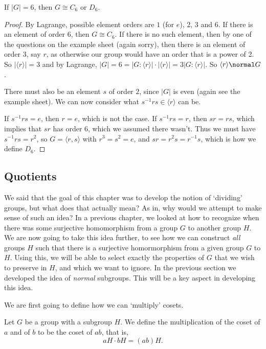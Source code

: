 \documentclass[a4paper]{scrartcl}
\newcommand{\newsection}{\subsection}
\begin{document}
\begin{proposition}
	If $|G| = 6$, then $G \cong C_6$ or $D_6$.
\end{proposition}
\begin{proof}
	By Lagrange, possible element orders are $1$ (for $e$), $2$, $3$ and $6$. If there is an element of order 6, then $G \cong C_6$. If there is no such element, then by one of the questions on the example sheet (again sorry), then there is an element of order $3$, say $r$, as otherwise our group would have an order that is a power of 2. So $|\langle r \rangle| = 3$ and by Lagrange, $|G| = 6 = |G: \langle r \rangle| \cdot |\langle r \rangle| = 3 |G: \langle r \rangle|$. So $\langle r \rangle \normal G$.

	There must also be an element $s$ of order $2$, since $|G|$ is even (again see the example sheet). We can now consider what $s^{-1} r s \in \langle r \rangle$ can be.

	If $s^{-1} r s = e$, then $r = e$, which is not the case. If $s^{-1} r s = r$, then $sr = rs$, which implies that $sr$ has order 6, which we assumed there wasn't. Thus we must have $s^{-1} r s = r^2$, so $G = \langle r, s \rangle$ with $r^3 = s^2 = e$, and $sr = r^2 s = r^{-1}s$, which is how we define $D_6$.
\end{proof}

\newsection{Quotients}

We said that the goal of this chapter was to develop the notion of `dividing' groups, but what does that actually mean? As in, why would we attempt to make sense of such an idea?
In a previous chapter, we looked at how to recognize when there was some surjective homomorphism from a group $G$ to another group $H$.
We are now going to take this idea further, to see how we can construct \emph{all} groups $H$ such that there is a surjective homormorphism from a given group $G$ to $H$.
Using this, we will be able to select exactly the properties of $G$ that we wish to preserve in $H$, and which we want to ignore.
In the previous section we developed the idea of \emph{normal} subgroups. This will be a key aspect in developing this idea.

We are first going to define how we can `multiply' cosets.

\begin{definition}
Let $G$ be a group with a subgroup $H$. We define the multiplication of the coset of $a$ and of $b$ to be the coset of $ab$, that is,
$$
aH \cdot bH = (ab)H.
$$
\end{definition}
\end{document}
